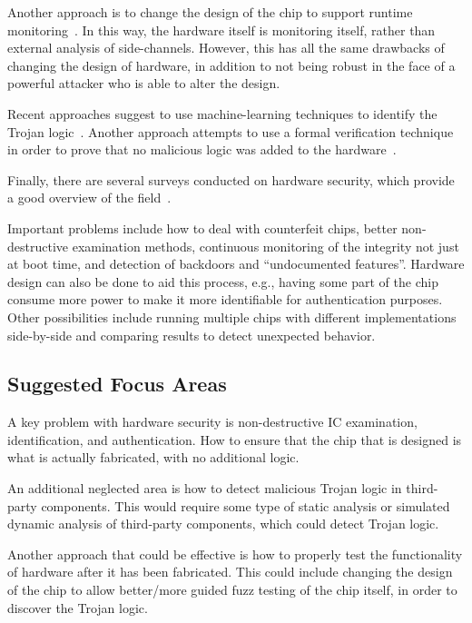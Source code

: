 \documentclass[11pt,letterpaper]{article}
\begin{document}
Another approach is to change the design of the chip to support
runtime monitoring~\cite{Waksman2010}. In this way, the hardware
itself is monitoring itself, rather than external analysis of
side-channels. However, this has all the same drawbacks of changing
the design of hardware, in addition to not being robust in the face of
a powerful attacker who is able to alter the design. 

Recent approaches suggest to use machine-learning techniques to
identify the Trojan logic~\cite{Haider2015}. Another approach attempts
to use a formal verification technique in order to prove that no
malicious logic was added to the hardware~\cite{Guo2015}.

Finally, there are several surveys conducted on hardware security,
which provide a good overview of the field~\cite{Wang2008,
  Tehranipoor2010, Guin2014, Guin2014a, Guin2014b}.

Important problems include how to deal with counterfeit chips, better
non-destructive examination methods, continuous monitoring of the
integrity not just at boot time, and detection of backdoors and 
``undocumented features''.  Hardware design can also be done to
aid this process, e.g., having some part of the chip consume more power
to make it more identifiable for authentication purposes.  Other
possibilities include running multiple chips with different
implementations side-by-side and comparing results to detect unexpected
behavior.

\subsection{Suggested Focus Areas}

A key problem with hardware security is non-destructive IC
examination, identification, and authentication. How to ensure that
the chip that is designed is what is actually fabricated, with no
additional logic.

An additional neglected area is how to detect malicious Trojan logic
in third-party components. This would require some type of static
analysis or simulated dynamic analysis of third-party components,
which could detect Trojan logic.

Another approach that could be effective is how to properly test the
functionality of hardware after it has been fabricated. This could
include changing the design of the chip to allow better/more guided
fuzz testing of the chip itself, in order to discover the Trojan
logic.
\end{document}
